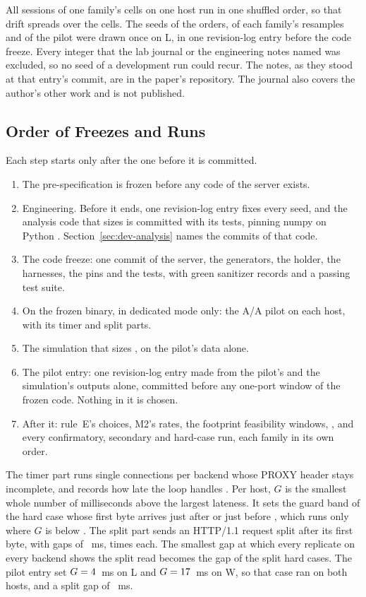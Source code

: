  All sessions of one family's cells on one host run in one shuffled order,
so that drift spreads over the cells. The \FrozenSeeds{} seeds of the orders, of each family's
resamples and of the pilot were drawn once on L, in one revision-log entry before the code
freeze. Every integer that the lab journal or the engineering notes named was excluded, so no
seed of a development run could recur. The notes, as they stood at that entry's commit, are in the
paper's repository. The journal also covers the author's other work and is not published.

\subsection{Order of Freezes and Runs}\label{sec:order}

Each step starts only after the one before it is committed.
\begin{enumerate}
\item The pre-specification is frozen before any code of the server exists.
\item Engineering. Before it ends, one revision-log entry fixes every seed, and the analysis code
that sizes \RC{} is committed with its tests, pinning numpy \NumpyVersion{} on Python
\PythonVersion. Section~\ref{sec:dev-analysis} names the commits of that code.
\item The code freeze: one commit of the server, the generators, the holder, the harnesses, the
pins and the tests, with green sanitizer records and a passing test suite.
\item On the frozen binary, in dedicated mode only: the A/A pilot on each host, with its timer and
split parts.
\item The simulation that sizes \RC, on the pilot's data alone.
\item The pilot entry: one revision-log entry made from the pilot's and the simulation's outputs
alone, committed before any one-port window of the frozen code. Nothing in it is chosen.
\item After it: rule~E's choices, M2's rates, the footprint feasibility windows, \Kbase{}, and
every confirmatory, secondary and hard-case run, each family in its own order.
\end{enumerate}

 The timer part runs \TimerRuns{} single connections per backend whose
PROXY header stays incomplete, and records how late the loop handles \Thdr. Per host, $G$ is the
smallest whole number of milliseconds above the largest lateness. It sets the guard band of the
hard case whose first byte arrives just after or just before \Tfb, which runs only where $G$ is
below \Tfb. The split part sends an HTTP/1.1 request split after its first byte, with gaps of
\SplitGaps~ms, \SplitReps{} times each. The smallest gap at which every replicate on every backend
shows the split read becomes the gap of the split hard cases. The pilot entry set $G = 4$~ms
on L and $G = 17$~ms on W, so that case ran on both hosts, and a split gap of \GapSplit~ms.

